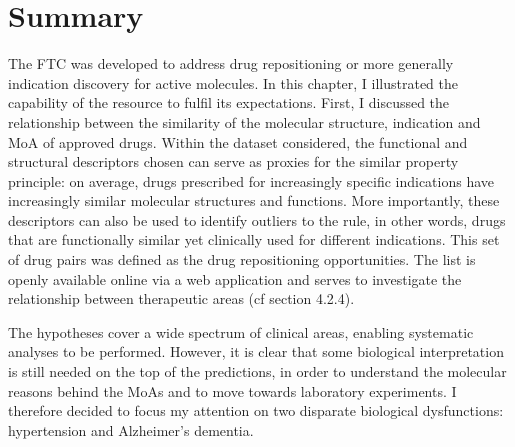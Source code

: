 \section{Summary}
The FTC was developed to address drug repositioning or more generally indication discovery for active molecules. In this chapter, I illustrated the capability of the resource to fulfil its expectations. First, I discussed the relationship between the similarity of the molecular structure, indication and MoA of approved drugs. Within the dataset considered, the functional and structural descriptors chosen can serve as proxies for the similar property principle: on average, drugs prescribed for increasingly specific indications have increasingly similar molecular structures and functions. More importantly, these descriptors can also be used to identify outliers to the rule, in other words, drugs that are functionally similar yet clinically used for different indications. This set of drug pairs was defined as the drug repositioning opportunities. The list is openly available online via a web application and serves to investigate the relationship between therapeutic areas (cf section 4.2.4).

The hypotheses cover a wide spectrum of clinical areas, enabling systematic analyses to be performed. However, it is clear that some biological interpretation is still needed on the top of the predictions, in order to understand the molecular reasons behind the MoAs and to move towards laboratory experiments. I therefore decided to focus my attention on two disparate biological dysfunctions: hypertension and Alzheimer's dementia.

